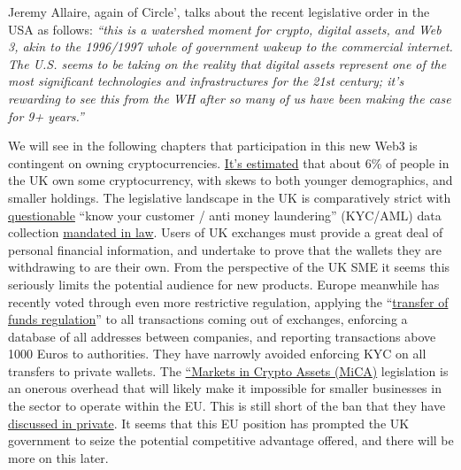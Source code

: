 Jeremy Allaire, again of Circle', talks about the recent legislative order in the USA as follows:
\textit{``this is a watershed moment for crypto, digital assets, and Web 3, akin to the 1996/1997 whole of government wakeup to the commercial internet. The U.S. seems to be taking on the reality that digital assets represent one of the most significant technologies and infrastructures for the 21st century; it's rewarding to see this from the WH after so many of us have been making the case for 9+ years.''}\par
We will see in the following chapters that participation in this new Web3 is contingent on owning cryptocurrencies. \href{https://www.finder.com/uk/cryptocurrency-statistics}{It's estimated} that about 6\% of people in the UK own some cryptocurrency, with skews to both younger demographics, and smaller holdings. The legislative landscape in the UK is comparatively strict with \href{https://uk.news.yahoo.com/perverse-impacts-anti-money-laundering-144239343.html}{questionable} ``know your customer / anti money laundering'' (KYC/AML) data collection \href{https://www.gov.uk/guidance/money-laundering-regulations-your-responsibilities}{mandated in law}. Users of UK exchanges must provide a great deal of personal financial information, and undertake to prove that the wallets they are withdrawing to are their own. From the perspective of the UK SME it seems this seriously limits the potential audience for new products. Europe meanwhile has recently voted through even more restrictive regulation, applying the ``\href{https://www.europarl.europa.eu/legislative-train/theme-an-economy-that-works-for-people/file-revision-of-the-regulation-on-transfers-of-funds}{transfer of funds regulation}'' to all transactions coming out of exchanges, enforcing a database of all addresses between companies, and reporting transactions above 1000 Euros to authorities. They have narrowly avoided enforcing KYC on all transfers to private wallets. The \href{https://www.consilium.europa.eu/en/press/press-releases/2022/06/30/digital-finance-agreement-reached-on-european-crypto-assets-regulation-mica/}{``Markets in Crypto Assets (MiCA)} legislation is an onerous overhead that will likely make it impossible for smaller businesses in the sector to operate within the EU. This is still short of the ban that they have \href{https://netzpolitik.org/2022/climate-measures-behind-closed-doors-eu-officials-talk-about-banning-bitcoin/}{discussed in private}. It seems that this EU position has prompted the UK government to seize the potential competitive advantage offered, and there will be more on this later.\par
